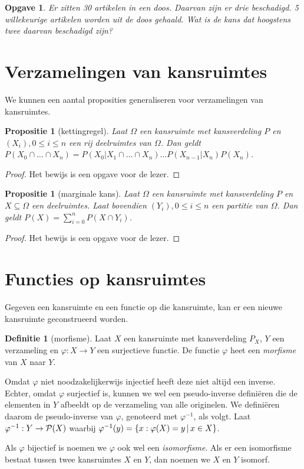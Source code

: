 \documentclass[a4paper]{book}
\newtheorem{proposition}[theorem]{Propositie}
\newtheorem{exercise}[theorem]{Opgave}
\theoremstyle{definition}
\newtheorem{definition}[theorem]{Definitie}
\begin{document}
\begin{exercise}
Er zitten 30 artikelen in een doos. Daarvan zijn er drie beschadigd.
5 willekeurige artikelen worden uit de doos gehaald. Wat is de kans dat hoogstens twee daarvan beschadigd zijn?
\end{exercise}


\section{Verzamelingen van kansruimtes}
We kunnen een aantal proposities generaliseren voor verzamelingen van kansruimtes.

\begin{proposition}[kettingregel]
    Laat $\Omega$ een kansruimte met kansverdeling $P$ en $(X_i), 0 \leq i \leq n$ een rij deelruimtes van $\Omega$.
    Dan geldt $P(X_0 \cap \dots \cap X_n) = P(X_0|X_1 \cap \dots \cap X_n) \dots P(X_{n-1}|X_n)P(X_n)$.
\end{proposition}
\begin{proof}
    Het bewijs is een opgave voor de lezer.
\end{proof}

\begin{proposition}[marginale kans]
    Laat $\Omega$ een kansruimte met kansverdeling $P$ en $X \subseteq \Omega$ een deelruimtes.
    Laat bovendien $(Y_i), 0 \leq i \leq n$ een partitie van $\Omega$.
    Dan geldt $P(X) = \sum_{i=0}^n P(X \cap Y_i)$.
\end{proposition}
\begin{proof}
    Het bewijs is een opgave voor de lezer.
\end{proof}


\section{Functies op kansruimtes}
Gegeven een kansruimte en een functie op die kansruimte, kan er een nieuwe kansruimte geconstrueerd worden.

\begin{definition}[morfisme]\label{morfisme}
    Laat $X$ een kansruimte met kansverdeling $P_X$, $Y$ een verzameling en $\varphi : X \to Y$ een surjectieve functie.
    De functie $\varphi$ heet een \emph{morfisme} van $X$ naar $Y$.

    Omdat $\varphi$ niet noodzakelijkerwijs injectief heeft deze niet altijd een inverse.
    Echter, omdat $\varphi$ surjectief is, kunnen we wel een pseudo-inverse defini\"eren die de elementen in $Y$ afbeeldt op de verzameling van alle originelen.
    We defini\"eren daarom de pseudo-inverse van $\varphi$, genoteerd met $\varphi^{-1}$, als volgt.
    Laat $\varphi^{-1} : Y \to \powerset{X}$ waarbij $\varphi^{-1}(y) = \set{x : \varphi(X) = y}{x \in X}$.

    Als $\varphi$ bijectief is noemen we $\varphi$ ook wel een \emph{isomorfisme}.
    Als er een isomorfisme bestaat tussen twee kansruimtes $X$ en $Y$, dan noemen we $X$ en $Y$ isomorf.
\end{definition}
\end{document}
